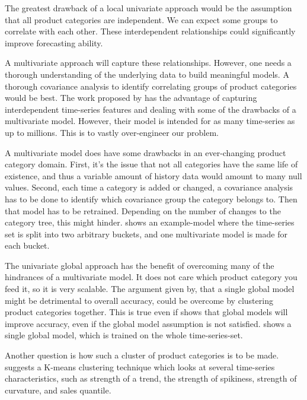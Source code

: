 The greatest drawback of a local univariate approach would be the assumption that all product categories
are independent. We can expect some groups to correlate with each other. These interdependent relationships
could significantly improve forecasting ability.

A multivariate approach will capture these relationships.
However, one needs a thorough understanding of the underlying data to build meaningful models.
A thorough covariance analysis to identify correlating groups of product categories would be best.
The work proposed by \cite{Sen2019} has the advantage of capturing interdependent time-series features and dealing with
some of the drawbacks of a multivariate model. However, their model is intended for as many time-series as up to millions.
This is to vastly over-engineer our problem.

A multivariate model does have some drawbacks in an ever-changing product category domain.
First, it's the issue that not all categories have the same life of existence, and thus a variable
amount of history data would amount to many null values.
Second, each time a category is added or changed, a covariance analysis has to be done to identify
which covariance group the category belongs to. Then that model has to be retrained.
Depending on the number of changes to the category tree, this might hinder.
 shows an example-model where the time-series set is split into two arbitrary buckets,
and one multivariate model is made for each bucket.

The univariate global approach has the benefit of overcoming many of the hindrances of a multivariate model.
It does not care which product category you feed it, so it is very scalable. The argument given by\cite{Bandara2017},
that a single global model might be detrimental to overall accuracy, could be overcome by clustering product categories together.
This is true even if \cite{Rabanser2020}
shows that global models will improve accuracy, even if the global model assumption is not satisfied.
 shows a single global model, which is trained on the whole time-series-set.

Another question is how such a cluster of product categories is to be made.
\cite{Bandara2017} suggests a K-means clustering technique
which looks at several time-series characteristics, such as
strength of a trend, the strength of spikiness, strength of curvature,
and sales quantile.

